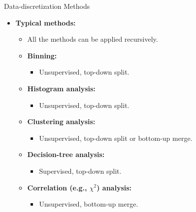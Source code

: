 \documentclass[aspectratio=169,t]{beamer}
\begin{document}
  {
    \begin{frame}{Data-discretization Methods}
    \begin{itemize}
      \item \textbf{Typical methods:}
      \begin{itemize}
        \item All the methods can be applied recursively.
        \item \textbf{Binning:}
              \begin{itemize}
                \item Unsupervised, top-down split.
              \end{itemize}
        \item \textbf{Histogram analysis:}
              \begin{itemize}
                \item Unsupervised, top-down split.
              \end{itemize}
        \item \textbf{Clustering analysis:}
              \begin{itemize}
                \item Unsupervised, top-down split or bottom-up merge.
              \end{itemize}
        \item \textbf{Decision-tree analysis:}
              \begin{itemize}
                \item Supervised, top-down split.
              \end{itemize}
        \item \textbf{Correlation (e.g., $\chi^2$) analysis:}
              \begin{itemize}
                \item Unsupervised, bottom-up merge.
              \end{itemize}
      \end{itemize}
    \end{itemize}
    \end{frame}
  }
\end{document}
